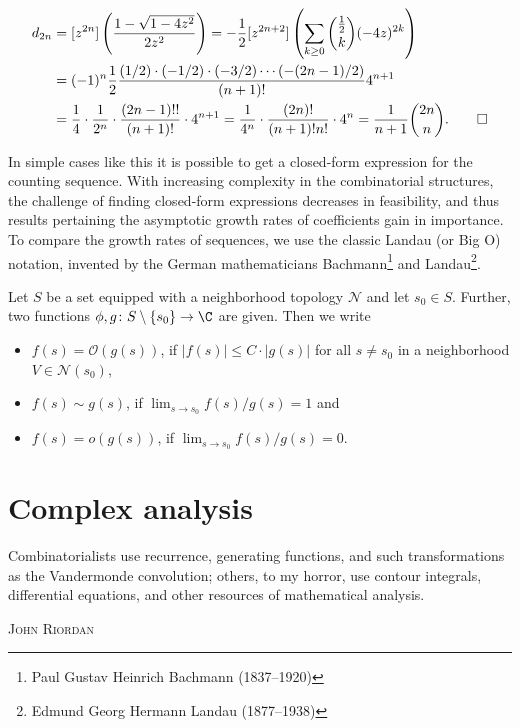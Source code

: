 \begin{example}
  \begin{align*}
    d_{2n} &= [z^{2n}] \left(\frac{1 - \sqrt{1 - 4z^2}}{2z^2}\right)
    = -\frac{1}{2}[z^{2n+2}]\left(\sum_{k \geq 0} \binom{\frac{1}{2}}{k} (-4z)^{2k}\right) \\
    &= (-1)^n\frac{1}{2} \frac{(1/2)\cdot(-1/2)\cdot(-3/2)\cdots(-(2n-1)/2)}{(n+1)!}4^{n+1} \\
    &= \frac{1}{4} \cdot \frac{1}{2^n} \cdot \frac{(2n-1)!!}{(n+1)!}\cdot 4^{n+1}
    = \frac{1}{4^n} \cdot \frac{(2n)!}{(n+1)!n!} \cdot 4^n
    = \frac{1}{n+1}\binom{2n}{n}. \qedhere
  \end{align*}
\end{example}

In simple cases like this it is possible to get a closed-form expression for the counting sequence. With increasing complexity in the combinatorial structures, the challenge of finding closed-form expressions decreases in feasibility, and thus results pertaining the asymptotic growth rates of coefficients gain in importance. To compare the growth rates of sequences, we use the classic Landau (or Big O) notation, invented by the German mathematicians Bachmann\footnote{Paul Gustav Heinrich Bachmann (1837--1920)} and Landau\footnote{Edmund Georg Hermann Landau (1877--1938)}.

\begin{definition}
  Let $S$ be a set equipped with a neighborhood topology $\mathcal{N}$ and let $s_0 \in S$. Further, two functions $\phi, g \colon S \setminus \{s_0\} \to \C$ are given. Then we write 
  \begin{itemize}
    \item $f(s) = \mathcal{O}(g(s))$, if $|f(s)| \leq C\cdot|g(s)|$ for all $s \neq s_0$ in a neighborhood $V \in \mathcal{N}(s_0)$,
    \item $f(s) \sim g(s)$, if $\lim_{s \to s_0} f(s)/g(s) = 1$ and
    \item $f(s) = o(g(s))$, if $\lim_{s \to s_0} f(s)/g(s) = 0$.
  \end{itemize}
\end{definition}

\section{Complex analysis}
\epigraph{Combinatorialists use recurrence, generating functions, and such transformations as the Vandermonde convolution; others, to my horror, use contour integrals, differential equations, and other resources of mathematical analysis.}{\textsc{John Riordan} \cite[Preface]{Riordan}}


